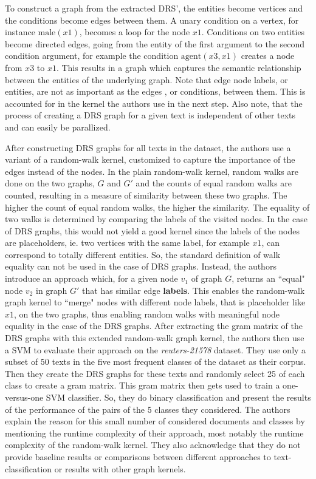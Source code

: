 
To construct a graph from the extracted DRS', the entities become vertices and the conditions become edges between them.
A unary condition on a vertex, for instance $\text{male}(x1)$, becomes a loop for the node $x1$.
Conditions on two entities become directed edges, going from the entity of the first argument to the second condition argument, for example the condition $\text{agent}(x3, x1)$ creates a node from $x3$ to $x1$.
This results in a graph which captures the semantic relationship between the entities of the underlying graph.
Note that edge node labels, or entities, are not as important as the edges , or conditions, between them.
This is accounted for in the kernel the authors use in the next step.
Also note, that the process of creating a DRS graph for a given text is independent of other texts and can easily be parallized.

After constructing DRS graphs for all texts in the dataset, the authors use a variant of a random-walk kernel, customized to capture the importance of the edges instead of the nodes.
In the plain random-walk kernel, random walks are done on the two graphs, $G$ and $G'$ and the counts of equal random walks are counted, resulting in a measure of similarity between these two graphs. The higher the count of equal random walks, the higher the similarity.
The equality of two walks is determined by comparing the labels of the visited nodes.
In the case of DRS graphs, this would not yield a good kernel since the labels of the nodes are placeholders, ie. two vertices with the same label, for example $x1$, can correspond to totally different entities.
So, the standard definition of walk equality can not be used in the case of DRS graphs.
Instead, the authors introduce an approach which, for a given node $v_1$ of graph $G$, returns an ``equal" node $v_2$ in graph $G'$ that has similar edge \textbf{labels}.
This enables the random-walk graph kernel to ``merge" nodes with different node labels, that is placeholder like $x1$, on the two graphs, thus enabling random walks with meaningful node equality in the case of the DRS graphs.
After extracting the gram matrix of the DRS graphs with this extended random-walk graph kernel, the authors then use a SVM to evaluate their approach on the \textit{reuters-21578} dataset.
They use only a subset of 50 texts in the five most frequent classes of the dataset as their corpus. Then they create the DRS graphs for these texts and randomly select 25 of each class to create a gram matrix.
This gram matrix then gets used to train a one-versus-one SVM classifier. So, they do binary classification and present the results of the performance of the pairs of the 5 classes they considered.
The authors explain the reason for this small number of considered documents and classes by mentioning the runtime complexity of their approach, most notably the runtime complexity of the random-walk kernel.
They also acknowledge that they do not provide baseline results or comparisons between different approaches to text-classification or results with other graph kernels.


